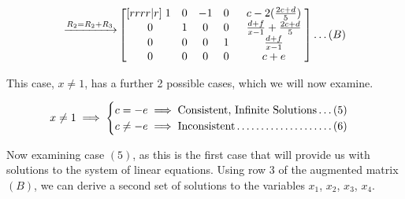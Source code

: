\documentclass[a4paper]{article}
\begin{document}
\begin{enumerate}[label=\textbf{\arabic*.}]
\begin{enumerate}
				$$
				\begin{matrix}
					~\\
					\xrightarrow{R_2 = R_2 + R_3}\\
					~\\
					~\\
				\end{matrix}
				\begin{bmatrix}[rrrr|r]
					\hspace{1mm} 1 & 0 & -1 & 0 \hspace{1mm} & \hspace{1mm} c - 2(\frac{2c + d}{5}) \hspace{1mm}\\
					\hspace{1mm} 0 & 1 & 0 & 0 \hspace{1mm} & \hspace{1mm} \frac{d + f}{x-1} + \frac{2c + d}{5} \hspace{1mm}\\
					\hspace{1mm} 0 & 0 & 0 & 1 \hspace{1mm} & \hspace{1mm} \frac{d + f}{x-1} \hspace{1mm}\\
					\hspace{1mm} 0 & 0 & 0 & 0 \hspace{1mm} & \hspace{1mm} c + e \hspace{1mm}\\
				\end{bmatrix}
				\dots(B)
				$$

				This case, $x \neq 1$, has a further 2 possible cases, which we will now examine.

				$$
				x \neq 1 \implies
				\begin{cases}
				c = -e \implies \text{Consistent, Infinite Solutions} \dots \dotfill (5)\\
				c \neq -e \implies \text{Inconsistent} \dotfill(6)\\
				\end{cases}
				$$

				Now examining case $(5)$, as this is the first case that will provide us with solutions to the system of linear equations.
				\bigbreak
				Using row $3$ of the augmented matrix $(B)$, we can derive a second set of solutions to the variables $x_1$, $x_2$, $x_3$, $x_4$.


\end{enumerate}
\end{enumerate}
\end{document}
